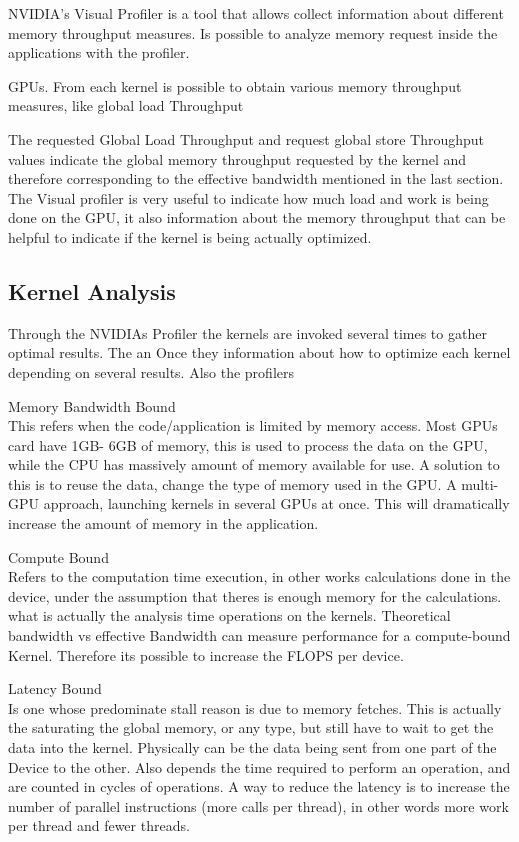 NVIDIA's Visual Profiler is a tool that allows collect information about different memory throughput measures. Is possible to analyze memory request inside the applications with the profiler. 

  GPUs. From each kernel is possible to obtain various memory throughput measures, like global load Throughput
  
  The requested Global Load Throughput and request global store Throughput values indicate the global memory throughput requested by the kernel and therefore corresponding to the effective bandwidth mentioned in the last section.
  The Visual profiler is very useful to indicate how much load and work is being done on the GPU, it also information about the memory throughput that can be helpful to indicate if the kernel is being actually optimized.  \cite{practices}
  
 \subsection{Kernel Analysis}

Through the NVIDIAs Profiler the kernels are invoked several times to gather optimal results. The an Once they information about how to optimize each kernel depending on several results. Also the profilers

\begin{description}

 \item{Memory Bandwidth Bound} \hfill \\
 This refers when the code/application is limited by memory access. Most GPUs card have 1GB- 6GB of memory, this is used to process the data on the GPU, while the CPU has massively amount of memory available for use. A solution to this is to reuse the data, change the type of memory used in the GPU. A multi-GPU approach, launching kernels in several GPUs at once. This will dramatically increase the amount of memory in the application.
  
  \item{Compute Bound} \hfill \\
Refers to the computation time execution, in other works calculations done in the device, under the assumption that  theres is enough memory for the calculations. what is actually the analysis time operations on the kernels. Theoretical bandwidth vs  effective Bandwidth can measure performance for a compute-bound Kernel. Therefore its possible to increase the FLOPS per device.
  
 \item{Latency Bound} \hfill \\
 Is one whose predominate stall reason is due to memory fetches. This is actually the saturating the global memory, or any type, but still have to wait to get the data into the kernel. Physically can be the data being sent from one part of the Device to the other. Also depends the time required to perform an operation, and are counted in cycles of operations. A way to reduce the latency is to increase the number of parallel instructions (more  calls per thread), in other words more work per thread and fewer threads.
 \end{description} 

